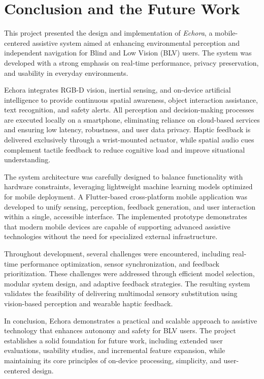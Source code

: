 \chapter{Conclusion and the Future Work}

This project presented the design and implementation of \textit{Echora}, a mobile-centered assistive system aimed at enhancing environmental perception and independent navigation for Blind and Low Vision (BLV) users. The system was developed with a strong emphasis on real-time performance, privacy preservation, and usability in everyday environments.

Echora integrates RGB-D vision, inertial sensing, and on-device artificial intelligence to provide continuous spatial awareness, object interaction assistance, text recognition, and safety alerts. All perception and decision-making processes are executed locally on a smartphone, eliminating reliance on cloud-based services and ensuring low latency, robustness, and user data privacy. Haptic feedback is delivered exclusively through a wrist-mounted actuator, while spatial audio cues complement tactile feedback to reduce cognitive load and improve situational understanding.

The system architecture was carefully designed to balance functionality with hardware constraints, leveraging lightweight machine learning models optimized for mobile deployment. A Flutter-based cross-platform mobile application was developed to unify sensing, perception, feedback generation, and user interaction within a single, accessible interface. The implemented prototype demonstrates that modern mobile devices are capable of supporting advanced assistive technologies without the need for specialized external infrastructure.

Throughout development, several challenges were encountered, including real-time performance optimization, sensor synchronization, and feedback prioritization. These challenges were addressed through efficient model selection, modular system design, and adaptive feedback strategies. The resulting system validates the feasibility of delivering multimodal sensory substitution using vision-based perception and wearable haptic feedback.

In conclusion, Echora demonstrates a practical and scalable approach to assistive technology that enhances autonomy and safety for BLV users. The project establishes a solid foundation for future work, including extended user evaluations, usability studies, and incremental feature expansion, while maintaining its core principles of on-device processing, simplicity, and user-centered design.